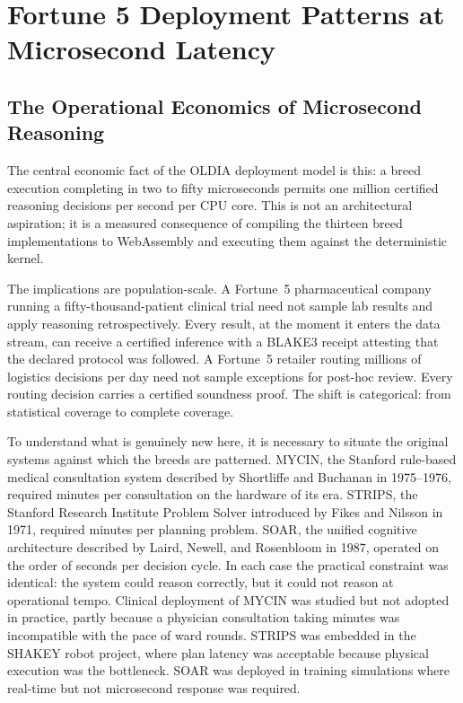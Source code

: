
\chapter{Fortune 5 Deployment Patterns at Microsecond Latency}
\label{ch:fortune5}

\section{The Operational Economics of Microsecond Reasoning}
\label{sec:economics}

The central economic fact of the OLDIA deployment model is this: a breed execution
completing in two to fifty microseconds permits one million certified reasoning
decisions per second per CPU core. This is not an architectural aspiration; it is
a measured consequence of compiling the thirteen breed implementations to WebAssembly
and executing them against the deterministic kernel.

The implications are population-scale. A Fortune~5 pharmaceutical company running
a fifty-thousand-patient clinical trial need not sample lab results and apply
reasoning retrospectively. Every result, at the moment it enters the data stream,
can receive a certified inference with a BLAKE3 receipt attesting that the declared
protocol was followed. A Fortune~5 retailer routing millions of logistics decisions
per day need not sample exceptions for post-hoc review. Every routing decision
carries a certified soundness proof. The shift is categorical: from statistical
coverage to complete coverage.

To understand what is genuinely new here, it is necessary to situate the original
systems against which the breeds are patterned. MYCIN, the Stanford rule-based
medical consultation system described by Shortliffe and Buchanan in 1975--1976,
required minutes per consultation on the hardware of its era. STRIPS, the Stanford
Research Institute Problem Solver introduced by Fikes and Nilsson in 1971, required
minutes per planning problem. SOAR, the unified cognitive architecture described by
Laird, Newell, and Rosenbloom in 1987, operated on the order of seconds per decision
cycle. In each case the practical constraint was identical: the system could reason
correctly, but it could not reason at operational tempo. Clinical deployment of MYCIN
was studied but not adopted in practice, partly because a physician consultation
taking minutes was incompatible with the pace of ward rounds. STRIPS was embedded
in the SHAKEY robot project, where plan latency was acceptable because physical
execution was the bottleneck. SOAR was deployed in training simulations where
real-time but not microsecond response was required.

